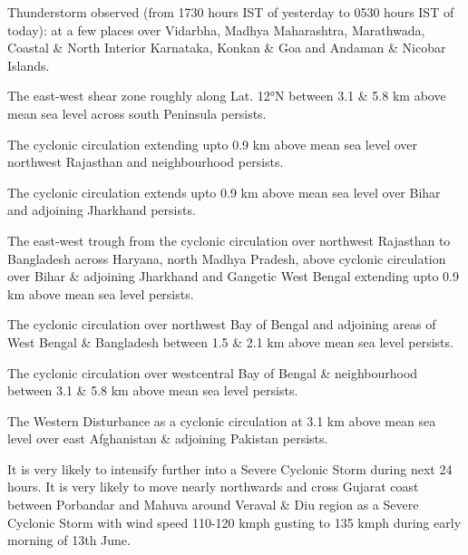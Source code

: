 \item Thunderstorm observed (from 1730 hours IST of yesterday to 0530 hours IST of today): at a few places over Vidarbha, Madhya Maharashtra, Marathwada, Coastal \& North Interior Karnataka, Konkan \& Goa and Andaman \& Nicobar Islands.
\item  The east-west shear zone roughly along Lat. 12°N between 3.1 \& 5.8 km above mean sea level across south Peninsula persists.
\item The cyclonic circulation extending upto 0.9 km above mean sea level over northwest Rajasthan and neighbourhood persists.
\item The cyclonic circulation extends upto 0.9 km above mean sea level over Bihar and adjoining Jharkhand persists.
\item The east-west trough from the cyclonic circulation over northwest Rajasthan to Bangladesh across Haryana, north Madhya Pradesh,
above cyclonic circulation over Bihar \& adjoining Jharkhand and Gangetic West Bengal extending upto 0.9 km above mean sea level
persists.
\item The cyclonic circulation over northwest Bay of Bengal and adjoining areas of West Bengal \& Bangladesh between 1.5 \& 2.1 km above
mean sea level persists.
\item The cyclonic circulation over westcentral Bay of Bengal \& neighbourhood between 3.1 \& 5.8 km above mean sea level persists.
\item The Western Disturbance as a cyclonic circulation at 3.1 km above mean sea level over east Afghanistan \& adjoining Pakistan persists.
\item It is very likely to
intensify further into a Severe Cyclonic Storm during next 24 hours. It is very likely to move nearly northwards and cross Gujarat coast
between Porbandar and Mahuva around Veraval \& Diu region as a Severe Cyclonic Storm with wind speed 110-120 kmph gusting to 135
kmph during early morning of 13th June.